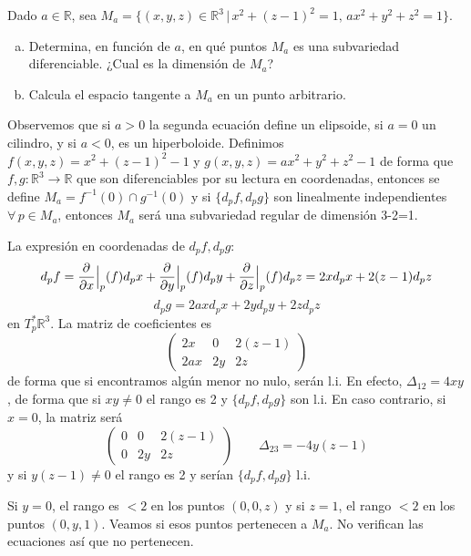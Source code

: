 \begin{ejer}
    [3.28] Dado $a \in \mathbb R$, sea $M_a =\{ (x, y, z) \in \mathbb R^3 \, |\, x^2 + (z - 1)^2 = 1,\, ax^2 + y^2 + z^2 = 1\}$.\begin{enumerate}[a)]
    \item Determina, en funci\'on de $a$, en qu\'e puntos $M_a$ es una subvariedad diferenciable. ¿Cual es la dimensi\'on de $M_a$? 
    \item Calcula el espacio tangente a $M_a$ en un punto arbitrario.
    \end{enumerate} 
\end{ejer}
\begin{sol}
    Observemos que si $a>0$ la segunda ecuaci\'on define un elipsoide, si $a=0$ un cilindro, y si $a<0$, es un hiperboloide. Definimos $f(x,y,z)=x^2+(z-1)^2-1$ y $g(x,y,z) = ax^2+y^2+z^2-1$ de forma que $f,g : \mathbb R^3 \to \mathbb R$ que son diferenciables por su lectura en coordenadas, entonces se define $M_a = f^{-1}(0) \cap g^{-1}(0)$ y si $\{d_pf, d_pg\}$ son linealmente independientes $\forall \, p \in M_a$, entonces $M_a$ ser\'a una subvariedad regular de dimensi\'on 3-2=1. 

    La expresi\'on en coordenadas de $d_pf, d_pg$:
    $$d_pf=\dfrac{\partial^{} }{\partial x} \Big|_p(f) d_px + \dfrac{\partial^{} }{\partial y} \Big|_p (f) d_py + \dfrac{\partial^{} }{\partial z} \Big|_p (f) d_pz = 2xd_px+2(z-1)d_pz$$
    $$d_pg=2ax d_px + 2yd_py + 2z d_pz$$
    en $T_p^* \mathbb R^3$. La matriz de coeficientes es
    $$\begin{pmatrix}
        2x & 0 & 2(z-1) \\ 2ax & 2y & 2z
    \end{pmatrix}$$
    de forma que si encontramos alg\'un menor no nulo, ser\'an l.i. En efecto, $\Delta_{12}=4xy$, de forma que si $xy \neq 0$ el rango es 2 y $\{d_pf,d_pg\}$ son l.i. En caso contrario, si $x=0$, la matriz ser\'a  $$\begin{pmatrix}
        0 & 0 & 2(z-1) \\ 0 & 2y & 2z
    \end{pmatrix} \qquad \Delta_{23} = -4y(z-1)$$
    y si $y(z-1)\neq 0$ el rango es 2 y ser\'ian $\{d_pf, d_pg\}$ l.i.

    Si $y=0$, el rango es $<2$ en los puntos $(0,0,z)$ y si $z=1$, el rango $<2$ en los puntos $(0,y,1)$. Veamos si esos puntos pertenecen a $M_a$. No verifican las ecuaciones as\'i que no pertenecen. 


\end{sol}
